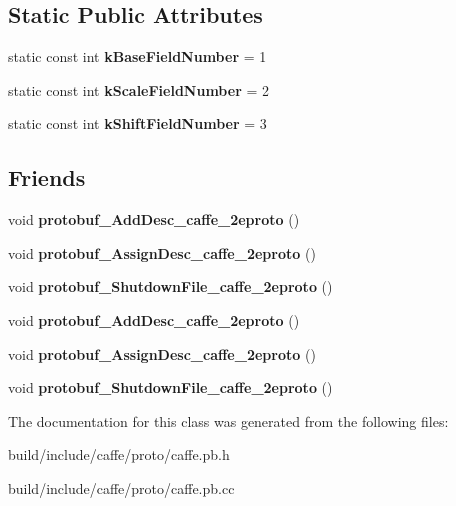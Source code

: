 \subsection*{Static Public Attributes}
\begin{DoxyCompactItemize}
\item 
\mbox{\label{classcaffe_1_1_log_parameter_a389b6cb2de29a5d46a666694fe001bd8}} 
static const int {\bfseries k\+Base\+Field\+Number} = 1
\item 
\mbox{\label{classcaffe_1_1_log_parameter_add0d2a39d9e9ed1d4efbe0a2fcd0e0b6}} 
static const int {\bfseries k\+Scale\+Field\+Number} = 2
\item 
\mbox{\label{classcaffe_1_1_log_parameter_a34e897b675003d743c86cb1bec84ff6b}} 
static const int {\bfseries k\+Shift\+Field\+Number} = 3
\end{DoxyCompactItemize}
\subsection*{Friends}
\begin{DoxyCompactItemize}
\item 
\mbox{\label{classcaffe_1_1_log_parameter_a2670a9c8ffd0e5105cf7522cd6f8613d}} 
void {\bfseries protobuf\+\_\+\+Add\+Desc\+\_\+caffe\+\_\+2eproto} ()
\item 
\mbox{\label{classcaffe_1_1_log_parameter_a7f145bddbdde78003d27e42c7e003d23}} 
void {\bfseries protobuf\+\_\+\+Assign\+Desc\+\_\+caffe\+\_\+2eproto} ()
\item 
\mbox{\label{classcaffe_1_1_log_parameter_a026784a8e4e76f1b4daf9d033d2ece83}} 
void {\bfseries protobuf\+\_\+\+Shutdown\+File\+\_\+caffe\+\_\+2eproto} ()
\item 
\mbox{\label{classcaffe_1_1_log_parameter_a2670a9c8ffd0e5105cf7522cd6f8613d}} 
void {\bfseries protobuf\+\_\+\+Add\+Desc\+\_\+caffe\+\_\+2eproto} ()
\item 
\mbox{\label{classcaffe_1_1_log_parameter_a7f145bddbdde78003d27e42c7e003d23}} 
void {\bfseries protobuf\+\_\+\+Assign\+Desc\+\_\+caffe\+\_\+2eproto} ()
\item 
\mbox{\label{classcaffe_1_1_log_parameter_a026784a8e4e76f1b4daf9d033d2ece83}} 
void {\bfseries protobuf\+\_\+\+Shutdown\+File\+\_\+caffe\+\_\+2eproto} ()
\end{DoxyCompactItemize}


The documentation for this class was generated from the following files\+:\begin{DoxyCompactItemize}
\item 
build/include/caffe/proto/caffe.\+pb.\+h\item 
build/include/caffe/proto/caffe.\+pb.\+cc\end{DoxyCompactItemize}
